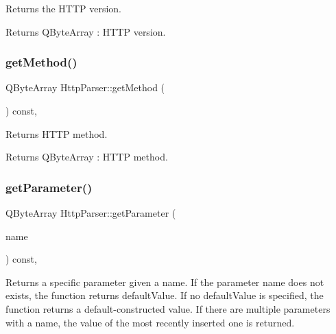 Returns the H\+T\+TP version. 

\begin{DoxyReturn}{Returns}
Q\+Byte\+Array \+: H\+T\+TP version. 
\end{DoxyReturn}
\mbox{\label{class_http_parser_a307aeb76a3a03ab84f3ae090038760ba}} 
\subsubsection{\texorpdfstring{get\+Method()}{getMethod()}}
{\footnotesize\ttfamily Q\+Byte\+Array Http\+Parser\+::get\+Method (\begin{DoxyParamCaption}{ }\end{DoxyParamCaption}) const\hspace{0.3cm}{\ttfamily [inline]}, {\ttfamily [noexcept]}}



Returns H\+T\+TP method. 

\begin{DoxyReturn}{Returns}
Q\+Byte\+Array \+: H\+T\+TP method. 
\end{DoxyReturn}
\mbox{\label{class_http_parser_aec19aa9b28449ed359dd0e516f24f3c4}} 
\subsubsection{\texorpdfstring{get\+Parameter()}{getParameter()}}
{\footnotesize\ttfamily Q\+Byte\+Array Http\+Parser\+::get\+Parameter (\begin{DoxyParamCaption}\item[{const Q\+Byte\+Array \&}]{name }\end{DoxyParamCaption}) const\hspace{0.3cm}{\ttfamily [inline]}, {\ttfamily [noexcept]}}



Returns a specific parameter given a name. If the parameter name does not exists, the function returns default\+Value. If no default\+Value is specified, the function returns a default-\/constructed value. If there are multiple parameters with a name, the value of the most recently inserted one is returned. 



